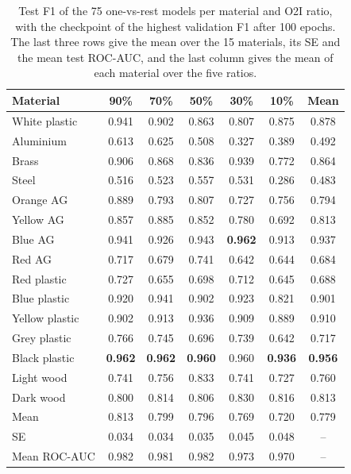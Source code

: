 \begin{table}[htbp]
\centering
\caption[Test F1 of the 75 one-vs-rest models]{Test F1 of the 75 one-vs-rest models per
material and O2I ratio, with the checkpoint of the highest validation F1 after 100
epochs. The last three rows give the mean over the 15 materials, its SE and the mean
test ROC-AUC, and the last column gives the mean of each material over the five ratios.}
\label{tab:ovr-full-results}
\small
\begin{tabular}{lcccccc}
\toprule
Material & 90\% & 70\% & 50\% & 30\% &
10\% & Mean \\
\midrule
White plastic  & 0.941 & 0.902 & 0.863 & 0.807 & 0.875 & 0.878 \\
Aluminium      & 0.613 & 0.625 & 0.508 & 0.327 & 0.389 & 0.492 \\
Brass          & 0.906 & 0.868 & 0.836 & 0.939 & 0.772 & 0.864 \\
Steel          & 0.516 & 0.523 & 0.557 & 0.531 & 0.286 & 0.483 \\
Orange AG      & 0.889 & 0.793 & 0.807 & 0.727 & 0.756 & 0.794 \\
Yellow AG      & 0.857 & 0.885 & 0.852 & 0.780 & 0.692 & 0.813 \\
Blue AG        & 0.941 & 0.926 & 0.943 & \textbf{0.962} & 0.913 & 0.937 \\
Red AG         & 0.717 & 0.679 & 0.741 & 0.642 & 0.644 & 0.684 \\
Red plastic    & 0.727 & 0.655 & 0.698 & 0.712 & 0.645 & 0.688 \\
Blue plastic   & 0.920 & 0.941 & 0.902 & 0.923 & 0.821 & 0.901 \\
Yellow plastic & 0.902 & 0.913 & 0.936 & 0.909 & 0.889 & 0.910 \\
Grey plastic   & 0.766 & 0.745 & 0.696 & 0.739 & 0.642 & 0.717 \\
Black plastic  & \textbf{0.962} & \textbf{0.962} & \textbf{0.960} & 0.960 & \textbf{0.936} & \textbf{0.956} \\
Light wood     & 0.741 & 0.756 & 0.833 & 0.741 & 0.727 & 0.760 \\
Dark wood      & 0.800 & 0.814 & 0.806 & 0.830 & 0.816 & 0.813 \\
\midrule
Mean          & 0.813 & 0.799 & 0.796 & 0.769 & 0.720 & 0.779 \\
SE            & 0.034 & 0.034 & 0.035 & 0.045 & 0.048 & -- \\
Mean ROC-AUC  & 0.982 & 0.981 & 0.982 & 0.973 & 0.970 & -- \\
\bottomrule
\end{tabular}
\end{table}

